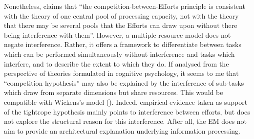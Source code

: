 Nonetheless, \citet[205]{gile_basic_2009} claims that ``the competition-between-Efforts principle is consistent with the theory of one central pool of processing capacity, not with the theory that there may be several pools that the Efforts can draw upon without there being interference with them''. However, a multiple resource model does not negate interference. Rather, it offers a framework to differentiate between tasks which can be performed simultaneously without interference and tasks which interfere, and to describe the extent to which they do. If analysed from the perspective of theories formulated in cognitive psychology, it seems to me that  ``competition hypothesis'' may also be explained by the interference of sub-tasks which draw from separate dimensions but share resources. This would be compatible with Wickens's model (). Indeed, empirical evidence taken as support of the tightrope hypothesis \citep{koshkin_testing_2018,gumul_searching_2018} mainly points to interference between efforts, but does not explore the structural reason for this interference. After all, the EM does not aim to provide an architectural explanation underlying information processing.



